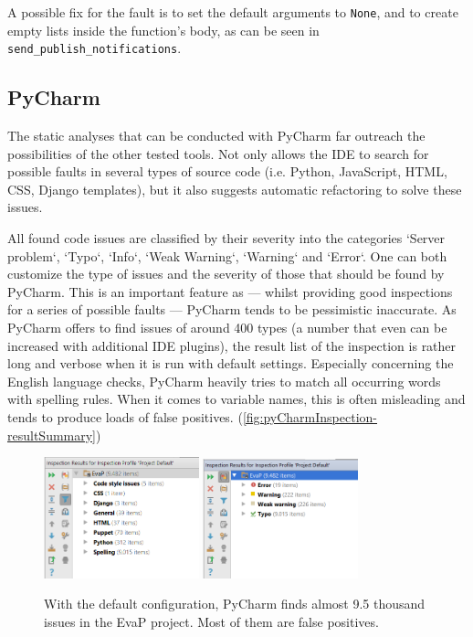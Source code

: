 A possible fix for the fault is to set the default arguments to \texttt{None}, and to create empty lists inside the function's body, as can be seen in \texttt{send\_publish\_notifications}.

\subsection{PyCharm}
The static analyses that can be conducted with PyCharm far outreach the possibilities of the other tested tools.
Not only allows the IDE to search for possible faults in several types of source code (i.e. Python, JavaScript, HTML, CSS, Django templates), but it also suggests automatic refactoring to solve these issues.

All found code issues are classified by their severity into the categories `Server problem`, `Typo`, `Info`, `Weak Warning`, `Warning` and `Error`.
One can both customize the type of issues and the severity of those that should be found by PyCharm.
This is an important feature as --- whilst providing good inspections for a series of possible faults --- PyCharm tends to be pessimistic inaccurate.
As PyCharm offers to find issues of around 400 types (a number that even can be increased with additional IDE plugins), the result list of the inspection is rather long and verbose when it is run with default settings.
Especially concerning the English language checks, PyCharm heavily tries to match all occurring words with spelling rules.
When it comes to variable names, this is often misleading and tends to produce loads of false positives. (\autoref{fig:pyCharmInspection-resultSummary})

\begin{figure}[h]
	\centering
	\includegraphics[width=0.4\textwidth]{graphics/pyCharmInspection-resultSummary}
	\includegraphics[width=0.4\textwidth]{graphics/pyCharmInspection-resultSummaryClassification}
	\caption{With the default configuration, PyCharm finds almost 9.5 thousand issues in the EvaP project. Most of them are false positives.}
	\label{fig:pyCharmInspection-resultSummary}
\end{figure}

